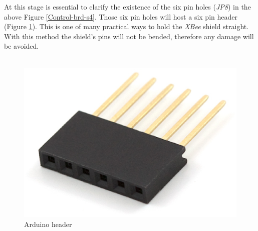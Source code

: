 \documentclass[12pt,a4paper,draft]{report}
\begin{document}
At this stage is essential to clarify the existence of the six pin holes (\textit{JP8}) in the above Figure \ref{Control-brd-s4}. Those six pin holes will host a six pin header (Figure \ref{Arduino_header}). This is one of many practical ways to hold the \textit{XBee} shield straight. With this method the shield's pins will not be bended, therefore any damage will be avoided.\\
\ \\
\begin{figure}[H]
\centering
\includegraphics*[scale=0.25]{arduino_header}
\caption{Arduino header}
\label{Arduino_header}
\end{figure}
%
\end{document}
